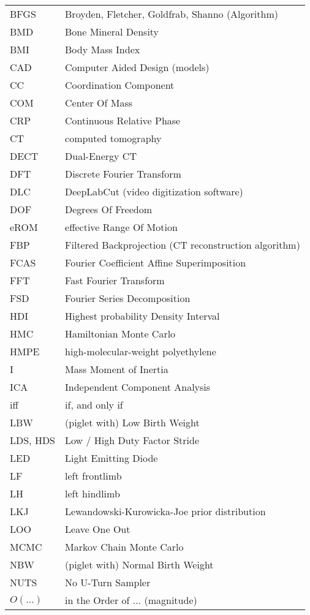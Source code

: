 \begin{small}
\begin{longtable}{l @{ -- } l}
   BFGS & Broyden, Fletcher, Goldfrab, Shanno (Algorithm)
\\ BMD & Bone Mineral Density
\\ BMI & Body Mass Index
\\ CAD & Computer Aided Design (models)
\\ CC & Coordination Component
\\ COM & Center Of Mass
\\ CRP & Continuous Relative Phase
\\ CT & computed tomography
\\ DECT & Dual-Energy CT
\\ DFT & Discrete Fourier Transform
\\ DLC & DeepLabCut (video digitization software)
\\ DOF & Degrees Of Freedom
\\ eROM & effective Range Of Motion
\\ FBP & Filtered Backprojection (CT reconstruction algorithm)
\\ FCAS & Fourier Coefficient Affine Superimposition
\\ FFT & Fast Fourier Transform
\\ FSD & Fourier Series Decomposition
\\ HDI & Highest probability Density Interval
\\ HMC & Hamiltonian Monte Carlo
\\ HMPE & high-molecular-weight polyethylene
\\ I & Mass Moment of Inertia
\\ ICA & Independent Component Analysis
\\ iff & if, and only if
\\ LBW & (piglet with) Low Birth Weight
\\ LDS, HDS & Low / High Duty Factor Stride
\\ LED & Light Emitting Diode
\\ LF & left frontlimb
\\ LH & left hindlimb
\\ LKJ & Lewandowski-Kurowicka-Joe prior distribution
\\ LOO & Leave One Out
\\ MCMC & Markov Chain Monte Carlo
\\ NBW & (piglet with) Normal Birth Weight
\\ NUTS & No U-Turn Sampler
\\ \(O\left(\ldots\right)\) & in the Order of ... (magnitude)

\end{longtable}
\end{small}

